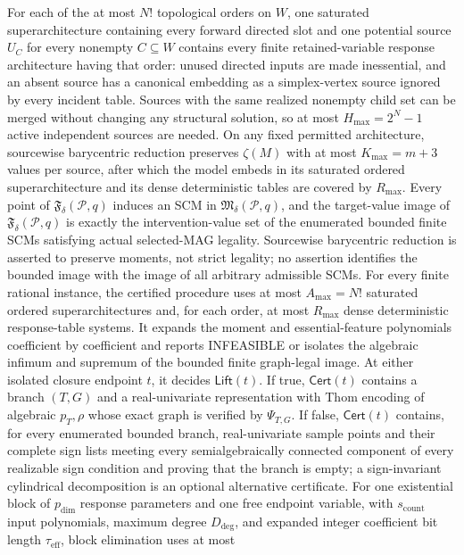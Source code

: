 For each of the at most \(N!\) topological orders on \(W\), one saturated superarchitecture containing every forward directed slot and one potential source \(U_C\) for every nonempty \(C\subseteq W\) contains every finite retained-variable response architecture having that order: unused directed inputs are made inessential, and an absent source has a canonical embedding as a simplex-vertex source ignored by every incident table.  Sources with the same realized nonempty child set can be merged without changing any structural solution, so at most \(H_{\max}=2^N-1\) active independent sources are needed.  On any fixed permitted architecture, sourcewise barycentric reduction preserves \(\zeta(M)\) with at most \(K_{\max}=m+3\) values per source, after which the model embeds in its saturated ordered superarchitecture and its dense deterministic tables are covered by \(R_{\max}\).  Every point of \(\mathfrak F_\delta(\mathcal P,q)\) induces an SCM in \(\mathfrak M_\delta(\mathcal P,q)\), and the target-value image of \(\mathfrak F_\delta(\mathcal P,q)\) is exactly the intervention-value set of the enumerated bounded finite SCMs satisfying actual selected-MAG legality.  Sourcewise barycentric reduction is asserted to preserve moments, not strict legality; no assertion identifies the bounded image with the image of all arbitrary admissible SCMs.
For every finite rational instance, the certified procedure uses at most \(A_{\max}=N!\) saturated ordered superarchitectures and, for each order, at most \(R_{\max}\) dense deterministic response-table systems.  It expands the moment and essential-feature polynomials coefficient by coefficient and reports INFEASIBLE or isolates the algebraic infimum and supremum of the bounded finite graph-legal image.  At either isolated closure endpoint \(t\), it decides \(\mathsf{Lift}(t)\).  If true, \(\mathsf{Cert}(t)\) contains a branch \((T,G)\) and a real-univariate representation with Thom encoding of algebraic \(p_T,\rho\) whose exact graph is verified by \(\Psi_{T,G}\).  If false, \(\mathsf{Cert}(t)\) contains, for every enumerated bounded branch, real-univariate sample points and their complete sign lists meeting every semialgebraically connected component of every realizable sign condition and proving that the branch is empty; a sign-invariant cylindrical decomposition is an optional alternative certificate.  For one existential block of \(p_{\mathrm{dim}}\) response parameters and one free endpoint variable, with \(s_{\mathrm{count}}\) input polynomials, maximum degree \(D_{\mathrm{deg}}\), and expanded integer coefficient bit length \(\tau_{\mathrm{eff}}\), block elimination uses at most
